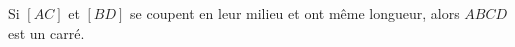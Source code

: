 Si $[AC]$ et $[BD]$ se coupent en leur milieu et ont même longueur, alors $ABCD$ est un carré.

\begin{reponses}
\end{reponses}

